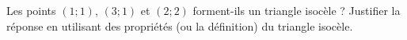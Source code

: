 
\begin{exercice}\label{exoSeconde-0003}

    Les points \( (1;1)\), \( (3;1)\) et \( (2;2)\) forment-ils un triangle isocèle ? Justifier la réponse en utilisant des propriétés (ou la définition) du triangle isocèle.

\end{exercice}

